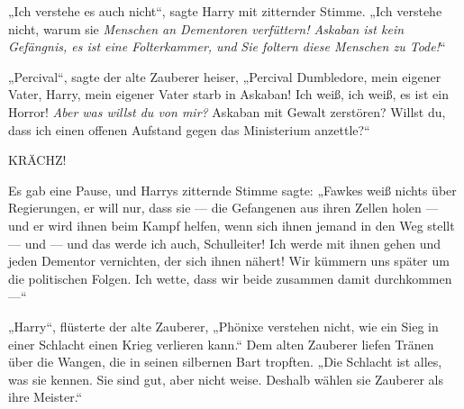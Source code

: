„Ich verstehe es auch nicht“, sagte Harry mit zitternder Stimme.
„Ich verstehe nicht, warum sie \emph{Menschen an Dementoren verfüttern! Askaban ist kein Gefängnis, es ist eine Folterkammer, und} \emph{Sie foltern diese Menschen zu Tode!}“

„Percival“, sagte der alte Zauberer heiser,
„Percival Dumbledore, mein eigener Vater, Harry, mein eigener Vater starb in Askaban! Ich weiß, ich weiß, es ist ein Horror! \emph{Aber was willst du von mir?} Askaban mit Gewalt zerstören? Willst du, dass ich einen offenen Aufstand gegen das Ministerium anzettle?“

\uppercase{Krächz}!

Es gab eine Pause, und Harrys zitternde Stimme sagte:
„Fawkes weiß nichts über Regierungen, er will nur, dass sie — die Gefangenen aus ihren Zellen holen — und er wird ihnen beim Kampf helfen, wenn sich ihnen jemand in den Weg stellt — und — und das werde ich auch, Schulleiter! Ich werde mit ihnen gehen und jeden Dementor vernichten, der sich ihnen nähert! Wir kümmern uns später um die politischen Folgen. Ich wette, dass wir beide zusammen damit durchkommen —“

„Harry“, flüsterte der alte Zauberer,
„Phönixe verstehen nicht, wie ein Sieg in einer Schlacht einen Krieg verlieren kann.“ Dem alten Zauberer liefen Tränen über die Wangen, die in seinen silbernen Bart tropften.
„Die Schlacht ist alles, was sie kennen. Sie sind gut, aber nicht weise. Deshalb wählen sie Zauberer als ihre Meister.“

